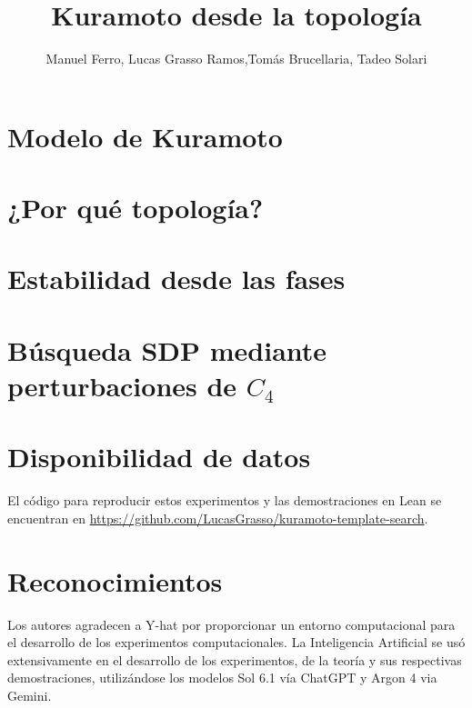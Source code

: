 \documentclass[11pt,a4paper]{article}
\title{\textbf{Kuramoto desde la topología}}
\author{Manuel Ferro, Lucas Grasso Ramos,Tomás Brucellaria, Tadeo Solari}
\date{}
\theoremstyle{plain}
\theoremstyle{definition}
\theoremstyle{remark}
\begin{document}
\maketitle

\section{Modelo de Kuramoto}


\section{¿Por qué topología?}


\section{Estabilidad desde las fases}


%

\section{Búsqueda SDP mediante perturbaciones de $C_4$}


\section{Disponibilidad de datos}\label{da}

El código para reproducir estos experimentos y las demostraciones en Lean se encuentran en \url{https://github.com/LucasGrasso/kuramoto-template-search}.

\section{Reconocimientos}
Los autores agradecen a Y-hat por proporcionar un entorno computacional para el desarrollo de los experimentos computacionales.
La Inteligencia Artificial se usó extensivamente en el desarrollo de los experimentos, de la teoría y sus respectivas demostraciones, utilizándose los modelos Sol 6.1 vía ChatGPT y Argon 4 via Gemini. 



\end{document}

